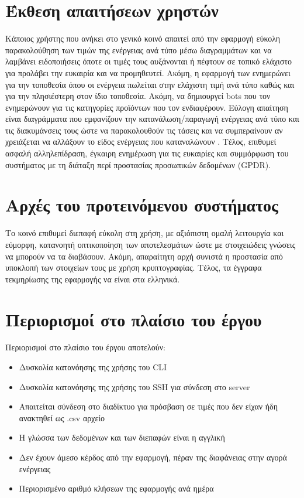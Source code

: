 \documentclass[a4paper,12pt, oneside]{article}
\begin{document}
\section{Έκθεση απαιτήσεων χρηστών}
Κάποιος χρήστης που ανήκει στο γενικό κοινό απαιτεί από την εφαρμογή εύκολη παρακολούθηση των τιμών της ενέργειας ανά τύπο μέσω διαγραμμάτων και να λαμβάνει ειδοποιήσεις όποτε οι τιμές τους αυξάνονται ή πέφτουν σε τοπικό ελάχιστο για προλάβει την ευκαιρία και να προμηθευτεί. Ακόμη,  η εφαρμογή των ενημερώνει για την τοποθεσία όπου οι ενέργεια πωλείται στην ελάχιστη τιμή ανά τύπο καθώς και για την πλησιέστερη στον ίδιο τοποθεσία. Ακόμη, να  δημιουργεί \textlatin{bots} που τον ενημερώνουν για τις κατηγορίες προϊόντων που τον ενδιαφέρουν. Εύλογη απαίτηση είναι διαγράμματα που εμφανίζουν την κατανάλωση/παραγωγή ενέργειας ανά τύπο και τις διακυμάνσεις τους ώστε να παρακολουθούν τις τάσεις και να συμπεραίνουν αν χρειάζεται να αλλάξουν το είδος ενέργειας που καταναλώνουν . Τέλος, επιθυμεί ασφαλή  αλληλεπίδραση, έγκαιρη ενημέρωση για  τις ευκαιρίες  και συμμόρφωση του συστήματος με τη διάταξη περί προστασίας προσωπικών δεδομένων \textlatin{(GPDR)}.


\section{Αρχές του προτεινόμενου συστήματος}
Το κοινό επιθυμεί διεπαφή εύκολη στη χρήση, με αξιόπιστη ομαλή λειτουργία  και εύμορφη, κατανοητή οπτικοποίηση των αποτελεσμάτων ώστε με στοιχειώδεις γνώσεις να μπορούν να τα διαβάσουν.   Ακόμη, απαραίτητη αρχή συνιστά η προστασία από υποκλοπή των στοιχείων τους με χρήση κρυπτογραφίας. Τέλος, τα έγγραφα τεκμηρίωσης της εφαρμογής να είναι στα ελληνικά.


\section{Περιορισμοί στο πλαίσιο του έργου}
Περιορισμοί στο πλαίσιο του έργου αποτελούν:
\begin{itemize}
  \item Δυσκολία κατανόησης της χρήσης του \textlatin{CLI}
  \item Δυσκολία κατανόησης της χρήσης του \textlatin{SSH} για σύνδεση στο \textlatin{server}
  \item Απαιτείται σύνδεση στο διαδίκτυο για πρόσβαση σε τιμές που δεν είχαν ήδη ανακτηθεί ως \textlatin{.csv} αρχείο
  \item Η γλώσσα των δεδομένων και των διεπαφών είναι η αγγλική
  \item Δεν έχουν άμεσο κέρδος από την εφαρμογή, πέραν της διαφάνειας στην αγορά ενέργειας  
  \item Περιορισμένο αριθμό κλήσεων της εφαρμογής ανά ημέρα
\end{itemize}
\newpage
\end{document}
